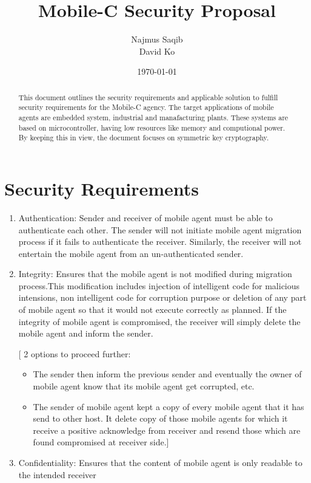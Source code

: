 \documentclass[letterpaper]{article}
\title{Mobile-C Security Proposal}
\author{Najmus Saqib \\
        David Ko}
\date{\today}
\begin{document}
\maketitle

\begin{abstract}
This document outlines the security requirements and applicable solution to
fulfill security requirements for the Mobile-C agency. The target applications
of mobile agents are embedded system, industrial and manafacturing plants. These 
systems are based on microcontroller, having low resources like memory and computional 
power. By keeping this in view, the document focuses on symmetric key cryptography.  
\end{abstract}

\section{Security Requirements}
\begin{enumerate}
\item Authentication: 
    Sender and receiver of mobile agent must be able to authenticate each other. The 
sender will not initiate mobile agent migration process if it fails to authenticate 
the receiver. Similarly, the receiver will not entertain the mobile agent from an 
un-authenticated sender.
\item Integrity:
    Ensures that the mobile agent is not modified during migration process.This 
modification includes injection of intelligent code for malicious intensions, non 
intelligent code for corruption purpose or deletion of any part of mobile agent so 
that it would not execute correctly as planned. If the integrity of mobile agent is
compromised, the receiver will simply delete the mobile agent and inform the sender.  


[ 2 options to proceed further:
\begin{itemize}
\item The sender then inform the previous sender and eventually the owner of mobile 
agent know that its mobile agent get corrupted, etc.  
\item The sender of mobile agent kept a copy of every mobile agent that it has send to 
other host. It delete copy of those mobile agents for which it receive a positive 
acknowledge from receiver and resend those which are found compromised at receiver side.]

\end{itemize}


\item Confidentiality:
    Ensures that the content of mobile agent is only readable to the intended receiver
\end{enumerate}
\end{document}
